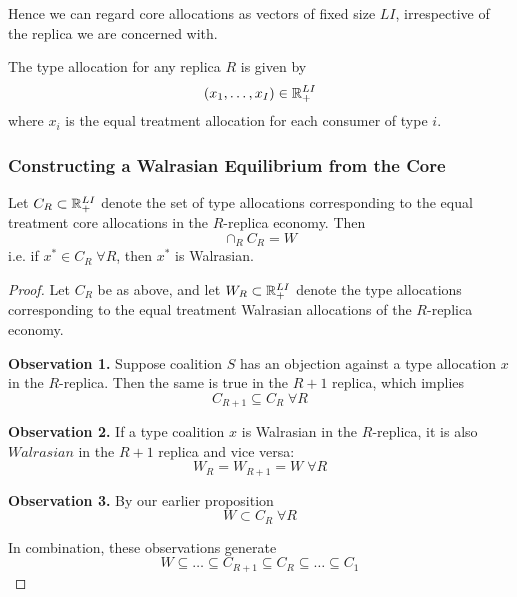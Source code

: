 Hence we can regard core allocations as vectors of fixed size $LI$,
irrespective of the replica we are concerned with.

\begin{definition}
  The type allocation for any replica $R$ is given by
  \[
  (x_1, \dots, x_{I}) \in {\mathbb R}^{LI}_+
  \]
  where $x_i$ is the equal treatment allocation for each consumer of
  type $i$.
\end{definition}

\subsubsection{Constructing a Walrasian Equilibrium from the Core}
\label{sec:constr-walr-equil}

\begin{theorem}
  Let $C_R \subset {\mathbb R}^{LI}_+$ denote the set of type allocations
  corresponding to the equal treatment core allocations in the
  $R$-replica economy. Then
  \[
  \cap_R C_R = W
  \]
  i.e. if $x^* \in C_R \; \forall R$, then $x^*$ is Walrasian.
\end{theorem}

\begin{proof}
  Let $C_R$ be as above, and let $W_R \subset {\mathbb R}^{LI}_+$ denote the
  type allocations corresponding to the equal treatment Walrasian
  allocations of the $R$-replica economy.

  \textbf{Observation 1.} Suppose coalition $S$ has an objection
  against a type allocation $x$ in the $R$-replica. Then the same is
  true in the $R+1$ replica, which implies
  \[
  C_{R+1} \subseteq C_R \; \forall R
  \]

  \textbf{Observation 2.} If a type coalition $x$ is Walrasian in the
  $R$-replica, it is also $Walrasian$ in the $R+1$ replica and vice
  versa:
  \[
  W_R = W_{R+1} = W \; \forall R
  \]

  \textbf{Observation 3.} By our earlier proposition
  \[
  W \subset C_R \; \forall R
  \]

  In combination, these observations generate
  \[
  W \subseteq \dots \subseteq C_{R+1} \subseteq C_R \subseteq \dots
  \subseteq C_1
  \]
\end{proof}
